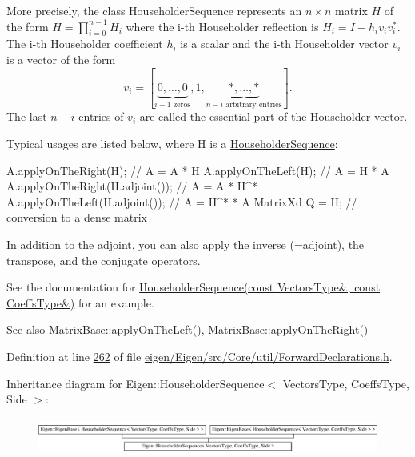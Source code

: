 More precisely, the class Householder\+Sequence represents an $ n \times n $ matrix $ H $ of the form $ H = \prod_{i=0}^{n-1} H_i $ where the i-\/th Householder reflection is $ H_i = I - h_i v_i v_i^* $. The i-\/th Householder coefficient $ h_i $ is a scalar and the i-\/th Householder vector $ v_i $ is a vector of the form \[ v_i = [\underbrace{0, \ldots, 0}_{i-1\mbox{ zeros}}, 1, \underbrace{*, \ldots,*}_{n-i\mbox{ arbitrary entries}} ]. \] The last $ n-i $ entries of $ v_i $ are called the essential part of the Householder vector.

Typical usages are listed below, where H is a \hyperlink{group___householder___module_class_eigen_1_1_householder_sequence}{Householder\+Sequence}\+: 
\begin{DoxyCode}
A.applyOnTheRight(H);             \textcolor{comment}{// A = A * H}
A.applyOnTheLeft(H);              \textcolor{comment}{// A = H * A}
A.applyOnTheRight(H.adjoint());   \textcolor{comment}{// A = A * H^*}
A.applyOnTheLeft(H.adjoint());    \textcolor{comment}{// A = H^* * A}
MatrixXd Q = H;                   \textcolor{comment}{// conversion to a dense matrix}
\end{DoxyCode}
 In addition to the adjoint, you can also apply the inverse (=adjoint), the transpose, and the conjugate operators.

See the documentation for \hyperlink{group___householder___module_af6aeede87ed8dac452f4fa8b4f45c3f2}{Householder\+Sequence(const Vectors\+Type\&, const Coeffs\+Type\&)} for an example.

\begin{DoxySeeAlso}{See also}
\hyperlink{group___core___module_a3a08ad41e81d8ad4a37b5d5c7490e765}{Matrix\+Base\+::apply\+On\+The\+Left()}, \hyperlink{group___core___module_a45d91752925d2757fc8058a293b15462}{Matrix\+Base\+::apply\+On\+The\+Right()} 
\end{DoxySeeAlso}


Definition at line \hyperlink{eigen_2_eigen_2src_2_core_2util_2_forward_declarations_8h_source_l00262}{262} of file \hyperlink{eigen_2_eigen_2src_2_core_2util_2_forward_declarations_8h_source}{eigen/\+Eigen/src/\+Core/util/\+Forward\+Declarations.\+h}.

Inheritance diagram for Eigen\+:\+:Householder\+Sequence$<$ Vectors\+Type, Coeffs\+Type, Side $>$\+:\begin{figure}[H]
\begin{center}
\leavevmode
\includegraphics[height=1.181435cm]{group___householder___module}
\end{center}
\end{figure}
